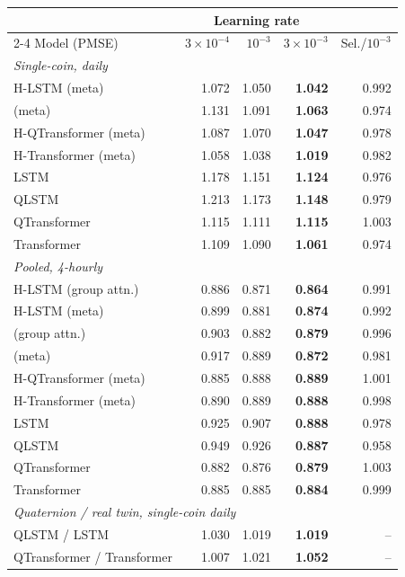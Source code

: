 \begin{tabular}{lrrrr}
\toprule
 & \multicolumn{3}{c}{Learning rate} & \\
\cmidrule(lr){2-4}
Model (PMSE) & $3{\times}10^{-4}$ & $10^{-3}$ & $3{\times}10^{-3}$ & Sel./$10^{-3}$ \\
\midrule
\multicolumn{5}{l}{\emph{Single-coin, daily}} \\
H-LSTM (meta) & 1.072 & 1.050 & \textbf{1.042} & 0.992 \\
\HQ{} (meta) & 1.131 & 1.091 & \textbf{1.063} & 0.974 \\
H-QTransformer (meta) & 1.087 & 1.070 & \textbf{1.047} & 0.978 \\
H-Transformer (meta) & 1.058 & 1.038 & \textbf{1.019} & 0.982 \\
LSTM & 1.178 & 1.151 & \textbf{1.124} & 0.976 \\
QLSTM & 1.213 & 1.173 & \textbf{1.148} & 0.979 \\
QTransformer & 1.115 & 1.111 & \textbf{1.115} & 1.003 \\
Transformer & 1.109 & 1.090 & \textbf{1.061} & 0.974 \\
\multicolumn{5}{l}{\emph{Pooled, 4-hourly}} \\
H-LSTM (group attn.) & 0.886 & 0.871 & \textbf{0.864} & 0.991 \\
H-LSTM (meta) & 0.899 & 0.881 & \textbf{0.874} & 0.992 \\
\HQ{} (group attn.) & 0.903 & 0.882 & \textbf{0.879} & 0.996 \\
\HQ{} (meta) & 0.917 & 0.889 & \textbf{0.872} & 0.981 \\
H-QTransformer (meta) & 0.885 & 0.888 & \textbf{0.889} & 1.001 \\
H-Transformer (meta) & 0.890 & 0.889 & \textbf{0.888} & 0.998 \\
LSTM & 0.925 & 0.907 & \textbf{0.888} & 0.978 \\
QLSTM & 0.949 & 0.926 & \textbf{0.887} & 0.958 \\
QTransformer & 0.882 & 0.876 & \textbf{0.879} & 1.003 \\
Transformer & 0.885 & 0.885 & \textbf{0.884} & 0.999 \\
\midrule
\multicolumn{5}{l}{\emph{Quaternion / real twin, single-coin daily}} \\
QLSTM / LSTM & 1.030 & 1.019 & \textbf{1.019} & -- \\
QTransformer / Transformer & 1.007 & 1.021 & \textbf{1.052} & -- \\

\end{tabular}
